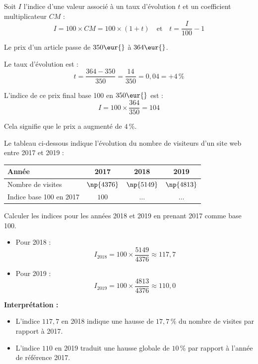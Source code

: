 \begin{prop}
	Soit $I$ l'indice d'une valeur associé à un taux d'évolution $t$ et un coefficient multiplicateur $CM$ :
	\[
		I = 100 \times CM = 100 \times (1 + t) \quad \text{et} \quad t = \dfrac{I}{100} - 1
	\]
\end{prop}

\begin{ex}
	Le prix d'un article passe de $350\eur{}$ à $364\eur{}$.

	Le taux d'évolution est :
	\[
		t = \dfrac{364 - 350}{350} = \dfrac{14}{350} = 0,04 = +4\,\%
	\]

	L'indice de ce prix final base 100 en $350\eur{}$ est :
	\[
		I = 100 \times \dfrac{364}{350} = 104
	\]

	Cela signifie que le prix a augmenté de $4\,\%$.
\end{ex}

\begin{methode}
	Le tableau ci-dessous indique l'évolution du nombre de visiteurs d'un site web entre 2017 et 2019 :
	\begin{center}
		\def\arraystretch{1.5}
		\begin{tabular}{|l|c|c|c|}
			\hline
			Année                   & 2017        & 2018        & 2019        \\ \hline
			Nombre de visites       & $\np{4376}$ & $\np{5149}$ & $\np{4813}$ \\ \hline
			Indice base 100 en 2017 & $100$       & $\dots$     & $\dots$     \\ \hline
		\end{tabular}
	\end{center}

	Calculer les indices pour les années 2018 et 2019 en prenant 2017 comme base 100.

	\begin{correction}
		\nline

		\begin{itemize}
			\item Pour 2018 :
			      \[
				      I_{2018} = 100 \times \dfrac{5149}{4376} \approx 117,7
			      \]
			\item Pour 2019 :
			      \[
				      I_{2019} = 100 \times \dfrac{4813}{4376} \approx 110,0
			      \]
		\end{itemize}

		\textbf{Interprétation :}
		\begin{itemize}
			\item L'indice $117,7$ en 2018 indique une hausse de $17,7\,\%$ du nombre de visites par rapport à 2017.
			\item L'indice $110$ en 2019 traduit une hausse globale de $10\,\%$ par rapport à l'année de référence 2017.
		\end{itemize}
	\end{correction}
\end{methode}
